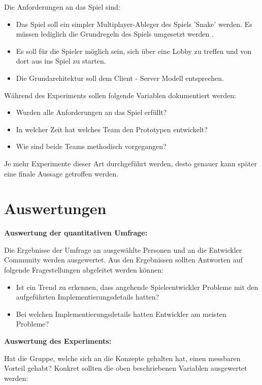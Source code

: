 Die Anforderungen an das Spiel sind:

\begin{itemize}
	\item Das Spiel soll ein simpler Multiplayer-Ableger des Spiels 'Snake' werden. Es müssen lediglich die Grundregeln des Spiels umgesetzt werden \cite{.22.02.2022}.
	\item Es soll für die Spieler möglich sein, sich über eine Lobby zu treffen und von dort aus ins Spiel zu starten.
	\item Die Grundarchitektur soll dem Client - Server Modell entsprechen.
\end{itemize}

Während des Experiments sollen folgende Variablen dokumentiert werden:

\begin{itemize}
	\item Wurden alle Anforderungen an das Spiel erfüllt?
	\item In welcher Zeit hat welches Team den Prototypen entwickelt?
	\item Wie sind beide Teams methodisch vorgegangen?
\end{itemize}

Je mehr Experimente dieser Art durchgeführt werden, desto genauer kann später eine finale Aussage getroffen werden.

\section{Auswertungen}
\textbf{Auswertung der quantitativen Umfrage:}

Die Ergebnisse der Umfrage an ausgewählte Personen und an die Entwickler Community werden ausgewertet. Aus den Ergebnissen sollten Antworten auf folgende Fragestellungen abgeleitet werden können:

\begin{itemize}
	\item Ist ein Trend zu erkennen, dass angehende Spieleentwickler Probleme mit den aufgeführten Implementierungsdetails hatten?
	\item Bei welchen Implementierungsdetails hatten Entwickler am meisten Probleme?
\end{itemize}

\newpage

\textbf{Auswertung des Experiments:}

Hat die Gruppe, welche sich an die Konzepte gehalten hat, einen messbaren Vorteil gehabt? Konkret sollten die oben beschriebenen Variablen ausgewertet werden:


